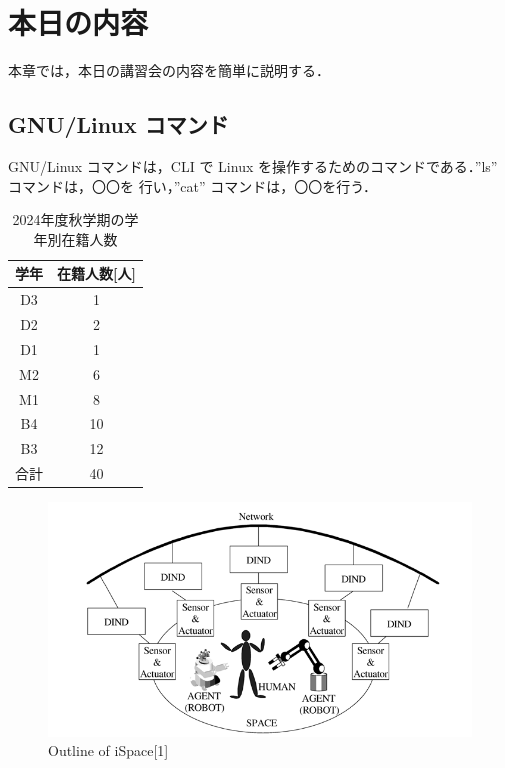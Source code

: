 \documentclass[11pt, a4paper]{jarticle}
\begin{document}
\section{本日の内容}
本章では，本日の講習会の内容を簡単に説明する．
\subsection{GNU/Linux コマンド}
GNU/Linux コマンドは，CLI で Linux を操作するためのコマンドである．”ls” コマンドは，〇〇を
行い，”cat” コマンドは，〇〇を行う．
\begin{table}[b] %
	\caption{2024年度秋学期の学年別在籍人数}
	\label{table1}
	\begin{center}
	\begin{tabular}{ c || c}
	\hline
	学年 & 在籍人数[人] \\ \hline
	\hline
	D3 & 1  \\ 
    D2 & 2  \\ 
    D1 & 1  \\ 
    M2 & 6  \\ 
    M1 & 8  \\ 
    B4 & 10  \\ 
    B3 & 12  \\ \hline
    合計 & 40  \\ \hline
	\end{tabular}
	\end{center}
\end{table}

\begin{figure}[tb] %
	\begin{center}
	\includegraphics[width=\linewidth]{figure3.png}
	\caption{Outline of iSpace[1]}
	\label{figure1}
	\end{center}
\end{figure}
\end{document}
